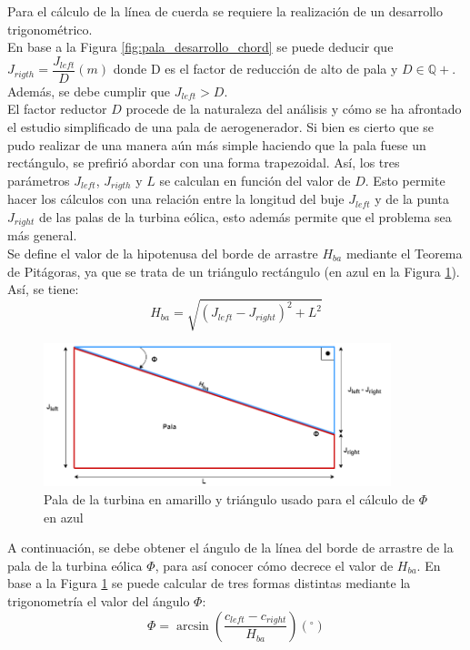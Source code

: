 Para el cálculo de la línea de cuerda se requiere la realización de un desarrollo trigonométrico. \\

En base a la Figura \ref{fig:pala_desarrollo_chord} se puede deducir que
$J_{rigth} = \dfrac{J_{left}}{D} (m)$ donde D es el factor de reducción de alto de pala y $D \in \mathbb{Q+}$. Además, se debe cumplir que $J_{left} > D$.\\

El factor reductor $D$ procede de la naturaleza del análisis y cómo se ha afrontado el estudio simplificado de una pala de aerogenerador. Si bien es cierto que se pudo realizar de una manera aún más simple haciendo que la pala fuese un rectángulo, se prefirió abordar con una forma trapezoidal. Así, los tres parámetros $J_{left}$, $J_{rigth}$ y $L$ se calculan en función del valor de $D$. Esto permite hacer los cálculos con una relación entre la longitud del buje $J_{left}$ y de la punta $J_{right}$ de las palas de la turbina eólica, esto además permite que el problema sea más general. \\

Se define el valor de la hipotenusa del borde de arrastre $H_{ba}$ mediante el Teorema de Pitágoras, ya que se trata de un triángulo rectángulo (en azul en la Figura \ref{fig:pala_calculo_phi}). Así, se tiene:
\begin{equation}
H_{ba} = \sqrt{(J_{left} - J_{right})^{2} + L^{2}}
\label{def_hipotenusa_pala}
\end{equation}


\begin{figure}[H]
    \centering
    \includegraphics[width=0.9\textwidth]{images/triangulo sacar phi.png}
    \caption{Pala de la turbina en amarillo y triángulo usado para el cálculo de $\Phi$ en azul}
    
    \label{fig:pala_calculo_phi}
\end{figure}

A continuación, se debe obtener el ángulo de la línea del borde de arrastre de la pala de la turbina eólica $\Phi$, para así conocer cómo decrece el valor de $H_{ba}$.
En base a la Figura \ref{fig:pala_calculo_phi} se puede calcular de tres formas distintas mediante la trigonometría el valor del ángulo $\Phi$:
\begin{equation}
 \Phi = \arcsin{\left(\dfrac{c_{left} - c_{right}}{H_{ba}}\right)} (^{\circ})
\label{def_angulo_phi_1}
\end{equation}

